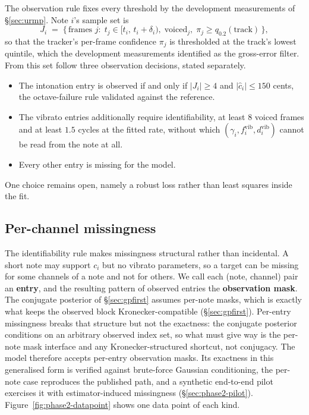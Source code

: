 The observation rule fixes every threshold by the development
measurements of \S\ref{sec:urmp}. Note $i$'s sample set is
\begin{equation}
  J_i \;=\; \bigl\{\, \text{frames } j:\; t_j \in [t_i,\, t_i + \delta_i),\;
  \text{voiced}_j,\; \pi_j \ge q_{0.2}(\text{track}) \,\bigr\},
  \label{eq:framerule}
\end{equation}
so that the tracker's per-frame confidence $\pi_j$ is thresholded at the
track's lowest quintile, which the development measurements identified as
the gross-error filter. From this set follow three observation decisions,
stated separately.
\begin{itemize}[leftmargin=\parindent,noitemsep]
  \item The intonation entry is observed if and only if $|J_i| \ge 4$ and
        $|\hat c_i| \le 150$ cents, the octave-failure rule validated
        against the reference.
  \item The vibrato entries additionally require identifiability, at
        least $8$ voiced frames and at least $1.5$ cycles at the fitted
        rate, without which $(\gamma_i, f_i^{\mathrm{vib}},
        d_i^{\mathrm{vib}})$ cannot be read from the note at all.
  \item Every other entry is missing for the model.
\end{itemize}
One choice remains open, namely a robust loss rather than least squares
inside the fit.

\subsection{Per-channel missingness}
The identifiability rule makes missingness structural rather than
incidental. A short note may support $c_i$ but no vibrato parameters, so
a target can be missing for some channels of a note and not for others.
We call each (note, channel) pair an \textbf{entry}, and the resulting
pattern of observed entries the \textbf{observation mask}. The conjugate
posterior of \S\ref{sec:gpfirst} assumes per-note masks, which is exactly
what keeps the observed block Kronecker-compatible (\S\ref{sec:gpfirst}).
Per-entry missingness breaks that structure but not the exactness: the
conjugate posterior conditions on an arbitrary observed index set, so
what must give way is the per-note mask interface and any
Kronecker-structured shortcut, not conjugacy. The model therefore accepts
per-entry observation masks. Its exactness in this generalised form is
verified against brute-force Gaussian conditioning, the per-note case
reproduces the published path, and a synthetic end-to-end pilot exercises
it with estimator-induced missingness (\S\ref{sec:phase2-pilot}).
Figure~\ref{fig:phase2-datapoint} shows one data point of each kind.

